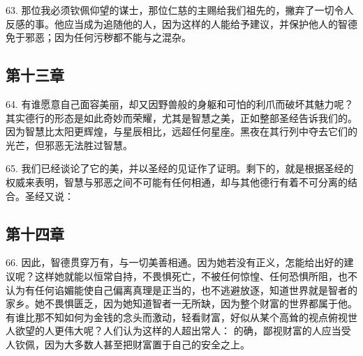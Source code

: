 63. 那位我必须钦佩仰望的谋士，那位仁慈的主赐给我们祖先的，撇弃了一切令人反感的事。他应当成为追随他的人，因为这样的人能给予建议，并保护他人的智德免于邪恶；因为任何污秽都不能与之混杂。\par


\subsection{第十三章}

\par

64. 有谁愿意自己面容美丽，却又因野兽般的身躯和可怕的利爪而破坏其魅力呢？其实德行的形态是如此奇妙而荣耀，尤其是智慧之美，正如整部圣经告诉我们的。因为智慧比太阳更辉煌，与星辰相比，远超任何星座。黑夜在其行列中夺去它们的光芒，但邪恶无法胜过智慧。\par

65. 我们已经谈论了它的美，并以圣经的见证作了证明。剩下的，就是根据圣经的权威来表明，智慧与邪恶之间不可能有任何相通，却与其他德行有着不可分离的结合。圣经又说： \par


\subsection{第十四章}

\par

66. 因此，智德贯穿万有，与一切美善相通。因为她若没有正义，怎能给出好的建议呢？这样她就能以恒常自持，不畏惧死亡，不被任何惊惶、任何恐惧所阻，也不认为有任何谄媚能使自己偏离真理是正当的，也不逃避放逐，知道世界就是智者的家乡。她不畏惧匮乏，因为她知道智者一无所缺，因为整个财富的世界都属于他。有谁比那不知如何为金钱的念头而激动，轻看财富，好似从某个高耸的视点俯视世人欲望的人更伟大呢？人们认为这样的人超出常人： 的确，鄙视财富的人应当受人钦佩，因为大多数人甚至把财富置于自己的安全之上。\par


